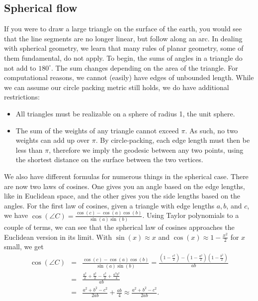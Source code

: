 \documentclass[12pt]{article}
\begin{document}
\subsection{Spherical flow}
If you were to draw a large triangle on the surface of the earth, you would see that the line segments are no longer linear, but follow along an arc. In dealing with spherical geometry, we learn that many rules of planar geometry, some of them fundamental, do not apply. To begin, the sums of angles in a triangle do not add to $180^\circ$. The sum changes depending on the area of the triangle. For computational reasons, we cannot (easily) have edges of unbounded length. While we can assume our circle packing metric still holds, we do have additional restrictions: 

\begin{itemize}
\item All triangles must be realizable on a sphere of radius 1, the unit sphere. 
\item The sum of the weights of any triangle cannot exceed $\pi.$ As such, no two weights can add up over $\pi$. By circle-packing, each edge length must then be less than $\pi$, therefore we imply the geodesic between any two points, using the shortest distance on the surface between the two vertices. 
\end{itemize}

\noindent We also have different formulas for numerous things in the spherical case. There are now two laws of cosines. One gives you an angle based on the edge lengths, like in Euclidean space, and the other gives you the side lengths based on the angles. For the first law of cosines, given a triangle with edge lengths $a, b$, and $c$, we have $\cos(\angle C) = \frac{\cos(c) - \cos(a)\cos(b)}{\sin(a)\sin(b)}$. Using Taylor polynomials to a couple of terms, we can see that the spherical law of cosines approaches the Euclidean version in its limit. With $\sin(x) \approx x$ and $\cos(x) \approx 1 - \frac{x^2}{2}$ for $x$ small, we get 
\begin{eqnarray*}
\cos(\angle C) &=& \frac{\cos(c) - \cos(a)\cos(b)}{\sin(a)\sin(b)} = \frac{(1 - \frac{c^2}{2}) - (1 - \frac{a^2}{2})(1 - \frac{b^2}{2})}{ab}\\
							&=& \frac{\frac{a^2}{2} + \frac{b^2}{2} - \frac{c^2}{2} + \frac{a^2b^2}{4}}{ab}\\
							&=& \frac{a^2 + b^2 - c^2}{2ab} + \frac{ab}{4} \approx \frac{a^2 + b^2 - c^2}{2ab}.
\end{eqnarray*}
\end{document}
